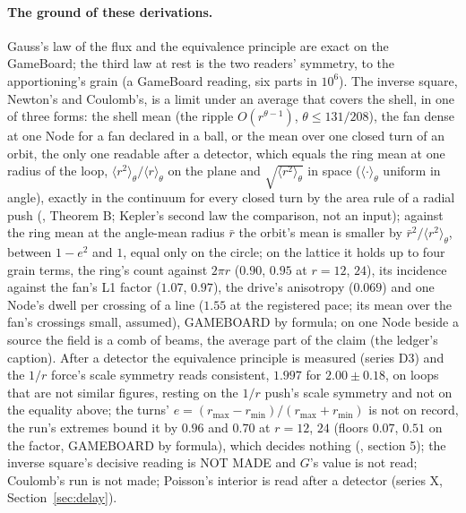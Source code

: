 \paragraph{The ground of these derivations.} Gauss's law of the flux and the equivalence principle are exact on the GameBoard; the third law at rest is the two readers' symmetry, to the apportioning's grain (a GameBoard reading, six parts in $10^6$). The inverse square, Newton's and Coulomb's, is a limit under an average that covers the shell, in one of three forms: the shell mean (the ripple $O(r^{\theta - 1})$, $\theta \le 131/208$), the fan dense at one Node for a fan declared in a ball, or the mean over one closed turn of an orbit, the only one readable after a detector, which equals the ring mean at one radius of the loop, $\langle r^2\rangle_\theta/\langle r\rangle_\theta$ on the plane and $\sqrt{\langle r^2\rangle_\theta}$ in space ($\langle\cdot\rangle_\theta$ uniform in angle), exactly in the continuum for every closed turn by the area rule of a radial push (\cite{ringmean}, Theorem B; Kepler's second law the comparison, not an input); against the ring mean at the angle-mean radius $\bar r$ the orbit's mean is smaller by $\bar r^2/\langle r^2\rangle_\theta$, between $1 - e^2$ and $1$, equal only on the circle; on the lattice it holds up to four grain terms, the ring's count against $2\pi r$ ($0.90$, $0.95$ at $r = 12$, $24$), its incidence against the fan's L1 factor ($1.07$, $0.97$), the drive's anisotropy ($0.069$) and one Node's dwell per crossing of a line ($1.55$ at the registered pace; its mean over the fan's crossings small, assumed), GAMEBOARD by formula; on one Node beside a source the field is a comb of beams, the average part of the claim (the ledger's caption). After a detector the equivalence principle is measured (series D3) and the $1/r$ force's scale symmetry reads consistent, $1.997$ for $2.00 \pm 0.18$, on loops that are not similar figures, resting on the $1/r$ push's scale symmetry and not on the equality above; the turns' $e = (r_{\max} - r_{\min})/(r_{\max} + r_{\min})$ is not on record, the run's extremes bound it by $0.96$ and $0.70$ at $r = 12$, $24$ (floors $0.07$, $0.51$ on the factor, GAMEBOARD by formula), which decides nothing (\cite{ringmean}, section 5); the inverse square's decisive reading is NOT MADE and $G$'s value is not read; Coulomb's run is not made; Poisson's interior is read after a detector (series X, Section~\ref{sec:delay}).





